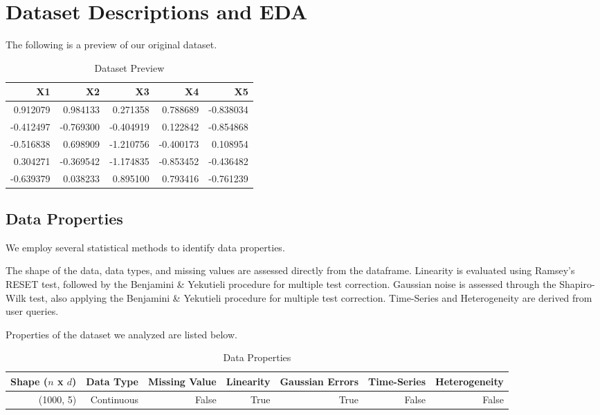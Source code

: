 \documentclass{article}
\begin{document}
\section{Dataset Descriptions and EDA}
The following is a preview of our original dataset.

\begin{table}[H]
    \centering
    \caption{Dataset Preview}
    \begin{tabular}{rrrrr}
\toprule
       X1 &        X2 &        X3 &        X4 &        X5 \\
\midrule
 0.912079 &  0.984133 &  0.271358 &  0.788689 & -0.838034 \\
-0.412497 & -0.769300 & -0.404919 &  0.122842 & -0.854868 \\
-0.516838 &  0.698909 & -1.210756 & -0.400173 &  0.108954 \\
 0.304271 & -0.369542 & -1.174835 & -0.853452 & -0.436482 \\
-0.639379 &  0.038233 &  0.895100 &  0.793416 & -0.761239 \\
\bottomrule
\end{tabular}

\end{table}

\subsection{Data Properties}
We employ several statistical methods to identify data properties.

The shape of the data, data types, and missing values are assessed directly from the dataframe.
Linearity is evaluated using Ramsey’s RESET test, followed by the Benjamini \& Yekutieli procedure for multiple test correction.
Gaussian noise is assessed through the Shapiro-Wilk test, also applying the Benjamini \& Yekutieli procedure for multiple test correction.
Time-Series and Heterogeneity are derived from user queries.

Properties of the dataset we analyzed are listed below.

\begin{table}[H]
    \centering
    \caption{Data Properties}
    \begin{tabular}{rrrrrrr}
            \toprule
            Shape ($n$ x $d$) & Data Type & Missing Value & Linearity & Gaussian Errors & Time-Series & Heterogeneity \\
            \midrule
            (1000, 5)   & Continuous & False & True & True & False & False \\
            \bottomrule
        \end{tabular}
        
\end{table}
\end{document}
